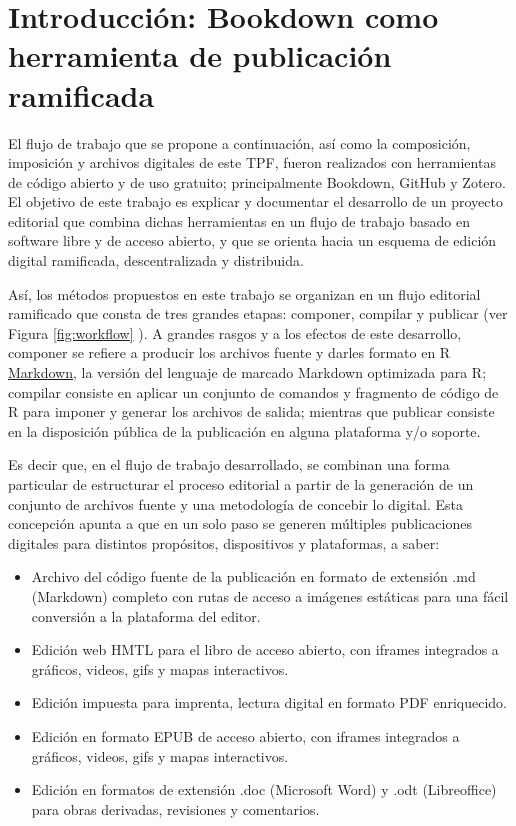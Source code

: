 \documentclass[
]{book}
\providecommand{\tightlist}{%
  \setlength{\itemsep}{0pt}\setlength{\parskip}{0pt}}
\begin{document}
\hypertarget{intro}{%
\chapter{Introducción: Bookdown como herramienta de publicación ramificada}\label{intro}}

El flujo de trabajo que se propone a continuación, así como la composición, imposición y archivos digitales de este TPF, fueron realizados con herramientas de código abierto y de uso gratuito; principalmente Bookdown, GitHub y Zotero. El objetivo de este trabajo es explicar y documentar el desarrollo de un proyecto editorial que combina dichas herramientas en un flujo de trabajo basado en software libre y de acceso abierto, y que se orienta hacia un esquema de edición digital ramificada, descentralizada y distribuida.

Así, los métodos propuestos en este trabajo se organizan en un flujo editorial ramificado que consta de tres grandes etapas: componer, compilar y publicar (ver Figura \ref{fig:workflow} ). A grandes rasgos y a los efectos de este desarrollo, componer se refiere a producir los archivos fuente y darles formato en R \href{https://es.wikipedia.org/wiki/Markdown}{Markdown}, la versión del lenguaje de marcado Markdown optimizada para R; compilar consiste en aplicar un conjunto de comandos y fragmento de código de R para imponer y generar los archivos de salida; mientras que publicar consiste en la disposición pública de la publicación en alguna plataforma y/o soporte.

Es decir que, en el flujo de trabajo desarrollado, se combinan una forma particular de estructurar el proceso editorial a partir de la generación de un conjunto de archivos fuente y una metodología de concebir lo digital. Esta concepción apunta a que en un solo paso se generen múltiples publicaciones digitales para distintos propósitos, dispositivos y plataformas, a saber:

\begin{itemize}
\tightlist
\item
  Archivo del código fuente de la publicación en formato de extensión .md (Markdown) completo con rutas de acceso a imágenes estáticas para una fácil conversión a la plataforma del editor.
\item
  Edición web HMTL para el libro de acceso abierto, con iframes integrados a gráficos, videos, gifs y mapas interactivos.
\item
  Edición impuesta para imprenta, lectura digital en formato PDF enriquecido.
\item
  Edición en formato EPUB de acceso abierto, con iframes integrados a gráficos, videos, gifs y mapas interactivos.
\item
  Edición en formatos de extensión .doc (Microsoft Word) y .odt (Libreoffice) para obras derivadas, revisiones y comentarios.
\end{itemize}
\end{document}
